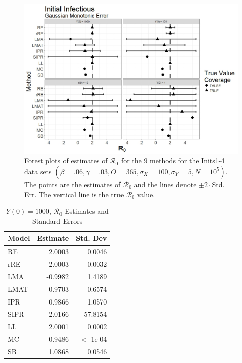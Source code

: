\documentclass[12pt]{article}
\newcommand{\xxsir}{\ensuremath{9} } %
\newcommand{\rr}{\ensuremath{\mathcal{R}_0}}
\begin{document}
\begin{figure}[H]
	\centering
	\includegraphics[scale=0.5]{images/start_nm.jpeg}
	\caption{Forest plots of estimates of $\rr$ for the \xxsir methods for the Inits1-4 data sets $(\beta=.06, \gamma=.03, O=365, \sigma_X=100, \sigma_Y=5, N=10^5)$.  The points are the estimates of $\rr$ and the lines denote $\pm 2\cdot $Std. Err.  The vertical line is the true $\rr$ value.}
\end{figure}


\begin{table}[H]
	
	\centering
	\begin{tabular}[t]{l|r|r}
		\hline
		Model & Estimate & Std. Dev\\
		\hline
		RE & 2.0003 & 0.0046\\
		\hline
		rRE & 2.0003 & 0.0032\\
		\hline
		LMA & -0.9982 & 1.4189\\
		\hline
		LMAT & 0.9703 & 0.6574\\
		\hline
		IPR & 0.9866 & 1.0570\\
		\hline
		SIPR & 2.0166 & 57.8154\\
		\hline
		LL & 2.0001 & 0.0002\\
		\hline
		MC & 0.9486 & $<$ 1e-04\\
		\hline
		SB & 1.0868 & 0.0546\\
		\hline
	\end{tabular}
	\caption{$Y(0) = 1000$, $\rr$ Estimates and Standard Errors}
\end{table}
\end{document}
